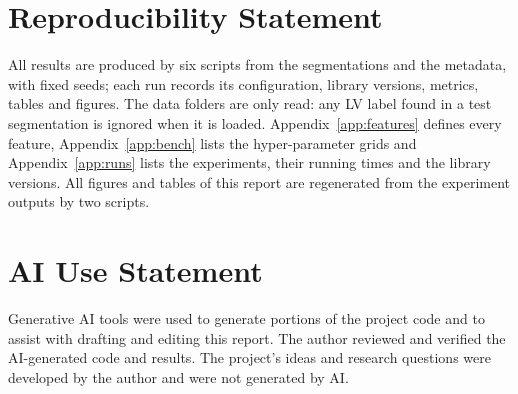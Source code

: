 \section*{Reproducibility Statement}
All results are produced by six scripts from the segmentations and the metadata, with fixed seeds; each run records its configuration, library versions, metrics, tables and figures. The data folders are only read: any LV label found in a test segmentation is ignored when it is loaded. Appendix~\ref{app:features} defines every feature, Appendix~\ref{app:bench} lists the hyper-parameter grids and Appendix~\ref{app:runs} lists the experiments, their running times and the library versions. All figures and tables of this report are regenerated from the experiment outputs by two scripts.

\section*{AI Use Statement}
Generative AI tools were used to generate portions of the project code and to assist with drafting and editing this report. The author reviewed and verified the AI-generated code and results. The project's ideas and research questions were developed by the author and were not generated by AI.
